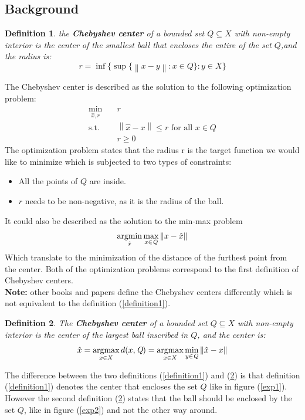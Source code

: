 \documentclass[]{article}
\newtheorem{definition}{Definition}[]
\newcommand{\norm}[1]{\left\lVert#1\right\rVert}
\newcommand{\Q}[0]{\textit{Q}}
\DeclareMathOperator*{\argmax}{argmax}
\DeclareMathOperator*{\argmin}{argmin}
\begin{document}
\subsection{Background}
\begin{definition}
	the \textbf{Chebyshev center}\cite{convexOptimization} of a bounded set $\textit{Q}\subseteq X$ with non-empty interior is the center of the smallest ball that encloses the entire of the set $\Q$,and the radius is:
	\begin{equation*}
		r=\inf\{\sup\{\norm{x-y}:x\in\Q\}:y\in X\}
	\end{equation*}
\end{definition}
The Chebyshev center is described as the solution to the following optimization problem:
\begin{equation}
	\label{OP1}
	\begin{aligned}
		\min_{\hat{x},r} \quad &r \\
		\text{s.t.}\quad &\norm{\hat{x} - x} \leq r \text{ for all }x\in\Q \\
		\quad & r\geq 0
	\end{aligned}
\end{equation}
The optimization problem states that the radius r is the target function we would like to minimize which is subjected to two types of constraints:
\begin{itemize}
	\item All the points of $\Q$ are inside.
	\item $r$ needs to be non-negative, as it is the radius of the ball.
\end{itemize}
It could also be described as the solution to the min-max problem
\begin{equation}
	\label{OP2}
	\argmin_{\hat{x}} \max_{x\in\Q} \space \norm{x-\hat{x}}
\end{equation}
Which translate to the minimization of the distance of the furthest point from the center. Both of the optimization problems correspond to the first definition of Chebyshev centers.\\
\textbf{Note:} other books and papers\cite{ParametricOptimization} define the Chebyshev centers differently which is not equivalent to the definition (\ref{definition1}).
\begin{definition}
	\label{definition2}
	The \textbf{Chebyshev center} of a bounded set $\Q\subseteq X$ with non-empty interior is the center of the largest ball inscribed in $\Q$, and the center is:
	\begin{equation}	
		\hat{x}=\argmax_{x\in X}\space d(x,\Q) = \argmax_{x\in X} \space \min_{y\in \Q} \norm{\hat{x} - x}
	\end{equation}
\end{definition}
The difference between the two definitions (\ref{definition1}) and (\ref{definition2}) is that definition (\ref{definition1}) denotes the center that encloses the set $\Q$ like in figure (\ref{exp1}). However the second definition (\ref{definition2}) states that the ball should be enclosed by the set $\Q$, like in figure (\ref{exp2}) and not the other way around.
\end{document}
